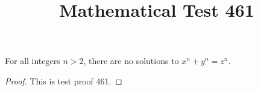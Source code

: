 \documentclass{amsart}
\begin{document}
\title{Mathematical Test 461}
\begin{theorem}
For all integers $n > 2$, there are no solutions to $x^n + y^n = z^n$.
\end{theorem}
\begin{proof}
This is test proof 461.
\end{proof}
\end{document}
